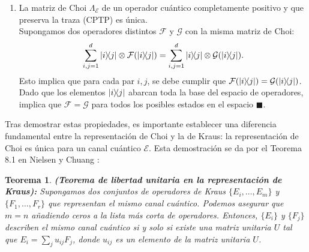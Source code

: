 \documentclass[letterpaper,12pt]{thesisECFM}
\theoremstyle{plain}
\newtheorem{thm}{Teorema}[section]
\theoremstyle{definition}
\theoremstyle{definition}
\theoremstyle{remark}
\newcommand{\1}{\mathbb{1}}
\begin{document}
\begin{enumerate}
    \textbf{Vuelta:} suponemos que $\text{Tr}_2(\Lambda) = I$ para $\Lambda$. Por lo que si usamos la representación del mapeo $\mathcal{F}$ según la ecuación (\ref{ec:canal_choi_form}) tenemos:
    \begin{align}
        \text{Tr} (\mathcal{F}(\rho)) &= \text{Tr}(\text{Tr}_1 [ \Lambda (\rho^{T} \otimes I)]).
    \end{align}
    Usando la propiedad cíclica de la traza $\text{Tr}(AB) = \text{Tr}(BA)$:
    \begin{align}
        &= \text{Tr}[(\rho^T \otimes I) \Lambda], \\
        &= \text{Tr}[\rho^T \cdot \text{Tr}_2(\Lambda)]\\
        &= \text{Tr}(\rho^T)\\
        &=\text{Tr}(\rho).
    \end{align}
    Por lo tanto, vemos que $\text{Tr}(\mathcal{F}(\rho))= \text{Tr}(\rho)$, esto muestra que $\mathcal{F}$ preserva la traza $\blacksquare$.

    \item La matriz de Choi $\Lambda_{\mathcal{E}}$ de un operador cuántico completamente positivo y que preserva la traza (CPTP)  es única. \\
    Supongamos dos operadores distintos $\mathcal{F}$ y $\mathcal{G}$ con la misma matriz de Choi:
    \begin{equation}
       \sum_{i, j=1}^{d} \ketbra{i}{j} \otimes \mathcal{F}(\ketbra{i}{j}) =  \sum_{i, j=1}^{d} \ketbra{i}{j} \otimes \mathcal{G}(\ketbra{i}{j}).
    \end{equation}
    Esto implica que para cada par $i, j$, se debe cumplir que $\mathcal{F}(\ketbra{i}{j}) = \mathcal{G}(\ketbra{i}{j})$. Dado que los elementos $\ketbra{i}{j}$ abarcan toda la base del espacio de operadores, implica que $\mathcal{F} = \mathcal{G}$ para todos los posibles estados en el espacio $\blacksquare$.
\end{enumerate}

Tras demostrar estas propiedades, es importante establecer una diferencia fundamental entre la representación de Choi y la de Kraus: la representación de Choi es única para un canal cuántico $\mathcal{E}$. Esta demostración se da por el Teorema 8.1 en Nielsen y Chuang \cite{nielsen_chuang_2011}: 

\begin{thm}\textbf{(Teorema de libertad unitaria en la representación de Kraus):}  Supongamos dos conjuntos de operadores de Kraus $\{E_i, \ldots, E_m\}$ y $\{F_1, \ldots, F_r\}$ que representan el mismo canal cuántico. Podemos asegurar que $m = n$ añadiendo ceros a la lista más corta de operadores. Entonces, $\{E_i\}$ y $\{F_j\}$ describen el mismo canal cuántico si y solo si existe una matriz unitaria $U$ tal que $E_i = \sum_j u_{ij} F_j$, donde $u_{ij}$ es un elemento de la matriz unitaria $U$.
\end{thm}
\end{document}
